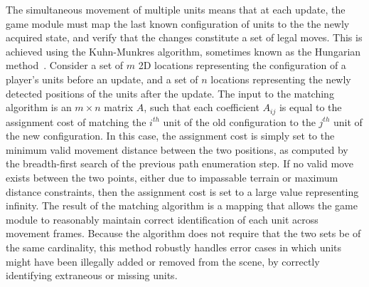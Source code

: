 \documentclass[review]{vgtc}                 %
\begin{document}
The simultaneous movement of multiple units means that at each update,
the game module must map the last known configuration of units to the
the newly acquired state, and verify that the changes constitute a set
of legal moves.  This is achieved using the Kuhn-Munkres algorithm,
sometimes known as the Hungarian
method~\cite{Kuhn1955,Munkres1957,MunkresCode}.
%
Consider a set of $m$ 2D locations representing the configuration of a
player's units before an update, and a set of $n$ locations
representing the newly detected positions of the units after the
update.  The input to the matching algorithm is an $m \times n$ matrix
$A$, such that each coefficient $A_{ij}$ is equal to the assignment
cost of matching the $ i^{th} $ unit of the old configuration to the $
j^{th} $ unit of the new configuration.  In this case, the assignment
cost is simply set to the minimum valid movement distance between the
two positions, as computed by the breadth-first search of the previous
path enumeration step.  If no valid move exists between the two
points, either due to impassable terrain or maximum distance
constraints, then the assignment cost is set to a large value
representing infinity.
%
The result of the matching algorithm is a mapping that allows the game
module to reasonably maintain correct identification of each unit
across movement frames.  Because the algorithm does not require that
the two sets be of the same cardinality, this method robustly handles
error cases in which units might have been illegally added or removed
from the scene, by correctly identifying extraneous or missing units.

\end{document}
